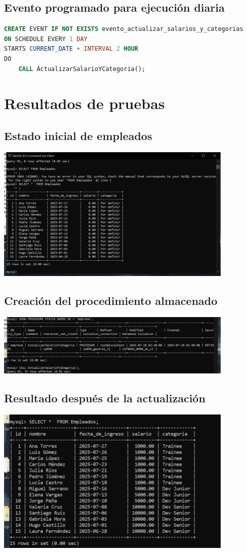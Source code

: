 \documentclass[12pt]{article}
\begin{document}
\subsection*{Evento programado para ejecución diaria}
\begin{lstlisting}[language=SQL]
CREATE EVENT IF NOT EXISTS evento_actualizar_salarios_y_categorias
ON SCHEDULE EVERY 1 DAY
STARTS CURRENT_DATE + INTERVAL 2 HOUR
DO
    CALL ActualizarSalarioYCategoria();
\end{lstlisting}

\section*{Resultados de pruebas}
\subsection*{Estado inicial de empleados}
\begin{center}
    \includegraphics[width=0.85\textwidth]{EmpleadosInicial.png}
\end{center}

\subsection*{Creación del procedimiento almacenado}
\begin{center}
    \includegraphics[width=0.85\textwidth]{StoreProcedure.png}
\end{center}

\subsection*{Resultado después de la actualización}
\begin{center}
    \includegraphics[width=0.85\textwidth]{EmpleadosPrueba.png}
\end{center}
\end{document}
